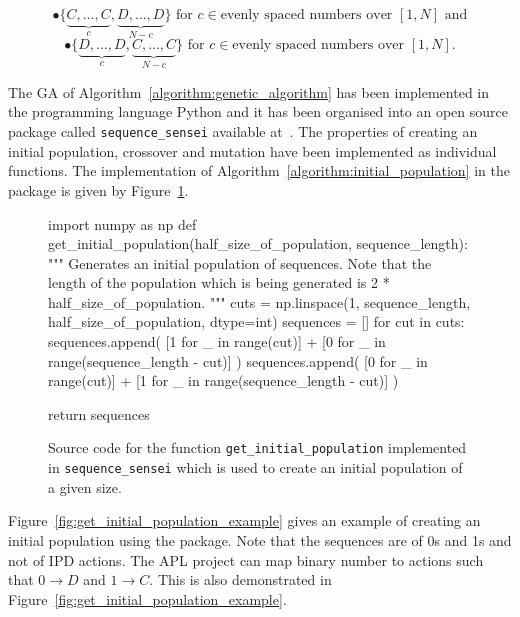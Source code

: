 \[\bullet \{\underbrace{C, \dots, C}_{c}, \underbrace{D, \dots, D}_{N-c}\} \text{ for } c \in \text{evenly spaced numbers over } [1, N] \text{ and}\]
\[\bullet \{\underbrace{D, \dots, D}_{c}, \underbrace{C, \dots, C}_{N-c}\} \text{ for } c \in \text{evenly spaced numbers over } [1, N].\]

The GA of Algorithm~\ref{algorithm:genetic_algorithm} has been implemented in the programming language Python
and it has been organised into an open source package called
\texttt{sequence_sensei} available at~\cite{Glynatsi_2020_sensei}.
The properties of creating an initial population, crossover and mutation have been
implemented as individual functions.
The implementation of Algorithm~\ref{algorithm:initial_population} in the package
is given by Figure~\ref{fig:get_initial_population}.

\begin{figure}[!htbp]
\begin{sourcepy}
import numpy as np
def get_initial_population(half_size_of_population, sequence_length):
    """
    Generates an initial population of sequences. Note that the length
    of the population which is being generated is 2 * half_size_of_population.
    """
    cuts = np.linspace(1, sequence_length, half_size_of_population, dtype=int)
    sequences = []
    for cut in cuts:
        sequences.append(
            [1 for _ in range(cut)] + [0 for _ in range(sequence_length - cut)]
        )
        sequences.append(
            [0 for _ in range(cut)] + [1 for _ in range(sequence_length - cut)]
        )

    return sequences
\end{sourcepy}
\caption{Source code for the function \texttt{get_initial_population}
implemented in \texttt{sequence_sensei} which is used to create an
initial population of a given size.}\label{fig:get_initial_population}
\end{figure}

Figure~\ref{fig:get_initial_population_example} gives an example of creating an
initial population using the package. Note that the sequences are of 0s and 1s
and not of IPD actions. The APL project can map binary number to actions such that
\(0 \to D\) and \(1 \to C\). This is also demonstrated in
Figure~\ref{fig:get_initial_population_example}.

